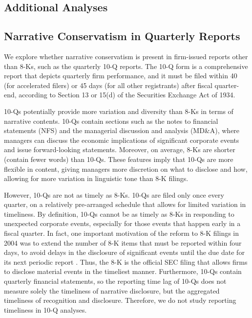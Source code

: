 \documentclass[letterpaper,12pt]{article}
\begin{document}
\begin{spacing}{1.5}
\section{Additional Analyses}
\subsection{Narrative Conservatism in Quarterly Reports}
\noindent We explore whether narrative conservatism is present in firm-issued reports other than 8-Ks, such as the quarterly 10-Q reports. The 10-Q form is a comprehensive report that depicts quarterly firm performance, and it must be filed within 40 (for accelerated filers) or 45 days (for all other registrants) after fiscal quarter-end, according to Section 13 or 15(d) of the Securities Exchange Act of 1934.

10-Qs potentially provide more variation and diversity than 8-Ks in terms of narrative contents. 10-Qs contain sections such as the notes to financial statements (NFS) and the managerial discussion and analysis (MD\&A), where managers can discuss the economic implications of significant corporate events and issue forward-looking statements. Moreover, on average, 8-Ks are shorter (contain fewer words) than 10-Qs. These features imply that 10-Qs are more flexible in content, giving managers more discretion on what to disclose and how, allowing for more variation in linguistic tone than 8-K filings.

However, 10-Qs are not as timely as 8-Ks. 10-Qs are filed only once every quarter, on a relatively pre-arranged schedule that allows for limited variation in timeliness. By definition, 10-Qs cannot be as timely as 8-Ks in responding to unexpected corporate events, especially for those events that happen early in a fiscal quarter. In fact, one important motivation of the reform to 8-K filings in 2004 was to extend the number of 8-K items that must be reported within four days, to avoid delays in the disclosure of significant events until the due date for its next periodic report \cite{secFinalRuleAdditional2004}. Thus, the 8-K is the official SEC filing that allows firms to disclose material events in the timeliest manner. Furthermore, 10-Qs contain quarterly financial statements, so the reporting time lag of 10-Qs does not measure solely the timeliness of narrative disclosure, but the aggregated timeliness of recognition and disclosure. Therefore, we do not study reporting timeliness in 10-Q analyses. 


\end{spacing}
\end{document}
